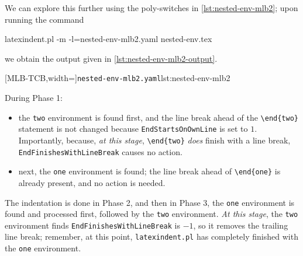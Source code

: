  \begin{example}
 We can explore this further using the poly-switches in \cref{lst:nested-env-mlb2}; upon
 running the command  

 \begin{commandshell}
latexindent.pl -m -l=nested-env-mlb2.yaml nested-env.tex
\end{commandshell}

 we obtain the output given in \cref{lst:nested-env-mlb2-output}.

 \begin{cmhtcbraster}
  [MLB-TCB,width=\linewidth]{\texttt{nested-env-mlb2.yaml}}{lst:nested-env-mlb2}
 \end{cmhtcbraster}

 During Phase 1:
 \begin{itemize}
  \item the \texttt{two} environment is found first, and the line break ahead of the
        \lstinline!\end{two}! statement is not changed because \texttt{EndStartsOnOwnLine} is set
        to $1$. Importantly, because, \emph{at this stage}, \lstinline!\end{two}! \emph{does}
        finish with a line break, \texttt{EndFinishesWithLineBreak} causes no action.
  \item next, the \texttt{one} environment is found; the line break ahead of
        \lstinline!\end{one}! is already present, and no action is needed.
 \end{itemize}
 The indentation is done in Phase 2, and then in Phase 3, the \texttt{one} environment is
 found and processed first, followed by the \texttt{two} environment. \emph{At this
 stage}, the \texttt{two} environment finds \texttt{EndFinishesWithLineBreak} is $-1$, so
 it removes the trailing line break; remember, at this point, \texttt{latexindent.pl} has
 completely finished with the \texttt{one} environment.
 \end{example}
